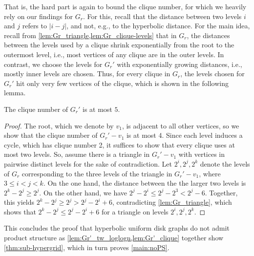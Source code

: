 %
That is, the hard part is again to bound the clique number, for which we heavily rely on our findings for $ G_r $.
For this, recall that the distance between two levels $ i $ and $ j $ refers to $ |i - j| $, and not, e.g., to the hyperbolic distance.
%
For the main idea, recall from \cref{lem:Gr_triangle,lem:Gr_clique-levels} that in $ G_r $, the distances between the levels used by a clique shrink exponentially from the root to the outermost level, i.e., most vertices of any clique are in the outer levels.
In contrast, we choose the levels for $ G_r' $ with exponentially growing distances, i.e., mostly inner levels are chosen.
Thus, for every clique in $G_r$, the levels chosen for $G_r'$ hit only very few vertices of the clique, which is shown in the following lemma.
%
\begin{lemma}\label{lem:Gr'_clique}
    The clique number of $ G_r' $ is at most $5$.
\end{lemma}
%
\begin{proof}
    The root, which we denote by $ v_1 $, is adjacent to all other vertices, so we show that the clique number of $ G_r' - v_1 $ is at most 4.
    Since each level induces a cycle, which has clique number 2, it suffices to show that every clique uses at most two levels.
    So, assume there is a triangle in $ G_r' - v_1 $ with vertices in pairwise distinct levels for the sake of contradiction.
    Let $ 2^i, 2^j, 2^k $ denote the levels of $ G_r $ corresponding to the three levels of the triangle in $ G_r' - v_1 $, where $ 3 \leq i < j < k $.
    On the one hand, the distance between the the larger two levels is $ 2^k - 2^j \geq 2^j $.
    On the other hand, we have $ 2^j - 2^i \leq 2^j - 2^3 < 2^j - 6 $.
    Together, this yields $ 2^k - 2^j \geq 2^j > 2^j - 2^i + 6 $,
    contradicting \cref{lem:Gr_triangle}, which shows that $ 2^k - 2^j \leq 2^j - 2^i + 6 $ for a triangle on levels $ 2^i, 2^j, 2^k $.
\end{proof}
%
This concludes the proof that hyperbolic uniform disk graphs do not admit product structure as \cref{lem:Gr'_tw_loglogn,lem:Gr'_clique} together show \cref{thm:sub-hypergrid}, which in turn proves \cref{main:noPS}.
%
% 
